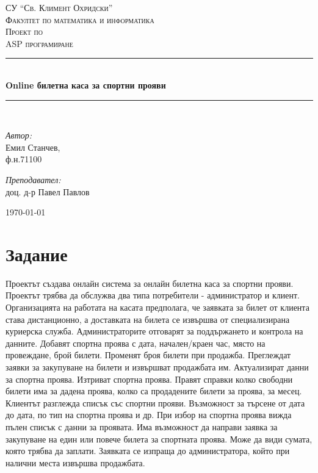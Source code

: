 \documentclass[a4paper,10pt, leqno]{article}
\newcommand{\HRule}{\rule{\linewidth}{0.5mm}}
\begin{document}
\begin{titlepage}
    \begin{center}
        \textsc{СУ ``Св. Климент Охридски''\\
        Факултет по математика и информатика
        }\\[5cm]

        \textsc{\large Проект по \\
        ASP програмиране
        }\\[0.5cm]
        \HRule \\[0.4cm]
        { \Large \bfseries Online билетна каса за спортни прояви
        }\\[0.4cm]
        \HRule \\[6cm]
        \begin{minipage}{0.49\textwidth}
            \begin{flushleft} \large
                \emph{Автор:}\\
                Емил Станчев,\\
                \small ф.н.71100
            \end{flushleft}
        \end{minipage}
        \begin{minipage}{0.49\textwidth}
            \begin{flushright} \large
                \emph{Преподавател:} \\
                доц. д-р Павел Павлов
            \end{flushright}
        \end{minipage}
        \vfill
        {\large \today}
    \end{center}
\end{titlepage}

\tableofcontents
\newpage

\section{Задание}
Проектът създава онлайн система за онлайн билетна каса за
спортни прояви. Проектът трябва да обслужва два типа
потребители - администратор и клиент. Организацията на работата
на касата предполага, че заявката за билет от клиента става
дистанционно, а доставката на билета се извършва от
специализирана куриерска служба.
Администраторите отговарят за поддържането и контрола на
данните. Добавят спортна проява с дата, начален/краен час,
място на провеждане, брой билети. Променят броя билети при
продажба. Преглеждат заявки за закупуване на билети и извършват
продажбата им. Актуализират данни за спортна проява. Изтриват
спортна проява. Правят справки колко свободни билети има за
дадена проява, колко са продадените билети за проява, за месец.
Клиентът разглежда списък със спортни прояви. Възможност за
търсене от дата до дата, по тип на спортна проява и др. При
избор на спортна проява вижда пълен списък с данни за проявата.
Има възможност да направи заявка за закупуване на един или
повече билета за спортната проява. Може да види сумата, която
трябва да заплати. Заявката се изпраща до администратора, който
при налични места извършва продажбата. 
\end{document}
